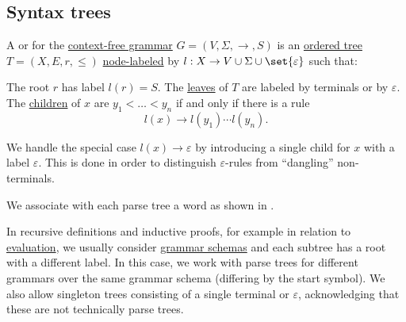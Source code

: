 \subsection{Syntax trees}\label{subsec:syntax_trees}

\begin{definition}\label{def:parse_tree}\mimprovised
  A  or  for the \hyperref[def:chomsky_hierarchy/context_free]{context-free grammar} \( G = (V, \Sigma, \to, S) \) is an \hyperref[def:ordered_tree]{ordered tree} \( T = (X, E, r, \leq) \) \hyperref[def:labeled_set]{node-labeled} by \( l: X \to V \cup \Sigma \cup \set{ \varepsilon } \) such that:
  \begin{thmenum}
     The root \( r \) has label \( l(r) = S \).
     The \hyperref[def:rooted_tree/leaf]{leaves} of \( T \) are labeled by terminals or by \( \varepsilon \).
     The \hyperref[def:rooted_tree/parent_child]{children} of \( x \) are \( y_1 < \ldots < y_n \) if and only if there is a rule
    \begin{equation*}
      l(x) \to l(y_1) \cdots l(y_n).
    \end{equation*}

    We handle the special case \( l(x) \to \varepsilon \) by introducing a single child for \( x \) with a label \( \varepsilon \). This is done in order to distinguish \( \varepsilon \)-rules from \enquote{dangling} non-terminals.
  \end{thmenum}
\end{definition}
\begin{comments}
  \item We associate with each parse tree a word as shown in .
\end{comments}

\begin{remark}\label{rem:parse_tree_roots}
  In recursive definitions and inductive proofs, for example in relation to \hyperref[rem:evaluation]{evaluation}, we usually consider \hyperref[ex:natural_number_arithmetic_grammar/rules]{grammar schemas} and each subtree has a root with a different label. In this case, we work with parse trees for different grammars over the same grammar schema (differing by the start symbol). We also allow singleton trees consisting of a single terminal or \( \varepsilon \), acknowledging that these are not technically parse trees.
\end{remark}

